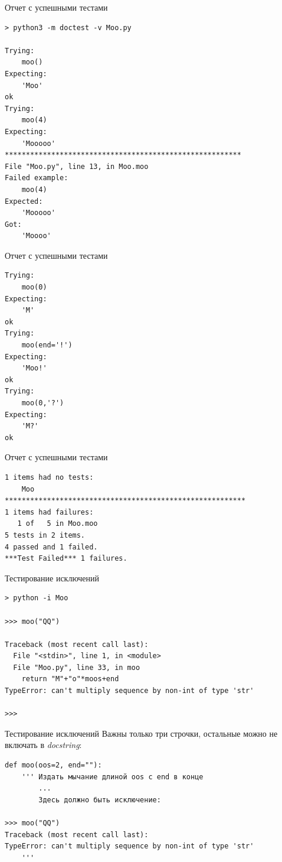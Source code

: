 \documentclass[xcolor=table]{beamer}
\begin{document}
\begin{frame}[t, fragile]{Отчет с успешными тестами}
	\begin{verbatim}
> python3 -m doctest -v Moo.py

Trying:
    moo()
Expecting:
    'Moo'
ok
Trying:
    moo(4)
Expecting:
    'Mooooo'
********************************************************
File "Moo.py", line 13, in Moo.moo
Failed example:
    moo(4)
Expected:
    'Mooooo'
Got:
    'Moooo'
	\end{verbatim}    
\end{frame}

\begin{frame}[t, fragile]{Отчет с успешными тестами}
	\begin{verbatim}
Trying:
    moo(0)
Expecting:
    'M'
ok
Trying:
    moo(end='!')
Expecting:
    'Moo!'
ok
Trying:
    moo(0,'?')
Expecting:
    'M?'
ok
	\end{verbatim}    
\end{frame}

\begin{frame}[t, fragile]{Отчет с успешными тестами}
	\begin{verbatim}
1 items had no tests:
    Moo	
*********************************************************
1 items had failures:
   1 of   5 in Moo.moo
5 tests in 2 items.
4 passed and 1 failed.
***Test Failed*** 1 failures.
	\end{verbatim}
\end{frame}

\begin{frame}[t, fragile]{Тестирование исключений}
	\begin{verbatim}
> python -i Moo

>>> moo("QQ")

Traceback (most recent call last):
  File "<stdin>", line 1, in <module>
  File "Moo.py", line 33, in moo
    return "M"+"o"*moos+end
TypeError: can't multiply sequence by non-int of type 'str'

>>>
	\end{verbatim}
\end{frame}

\begin{frame}[t, fragile]{Тестирование исключений}
	Важны только три строчки, остальные можно не включать в \textit{docstring}:
	\begin{verbatim}
def moo(oos=2, end=""):
    ''' Издать мычание длиной oos с end в конце
		...
		Здесь должно быть исключение:
		
>>> moo("QQ")
Traceback (most recent call last):
TypeError: can't multiply sequence by non-int of type 'str'
	'''
	\end{verbatim}
\end{frame}
\end{document}
